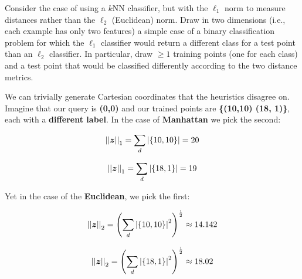 \documentclass[fleqn]{article}
\begin{document}
Consider the case of using a $k$NN classifier, but with the $\ell_1$
norm to measure distances rather than the $\ell_2$ (Euclidean) norm.
Draw in two dimensions (i.e., each example has only two features) 
a simple case of a binary classification problem for which the 
$\ell_1$ classifier would return a different class for a test point 
than an $\ell_2$ classifier.  In particular, draw $\geq 1$ training 
points (one for each class) and a test point that would be classified 
differently according to the two distance metrics.

\begin{solution}
We can trivially generate Cartesian coordinates that the heuristics disagree on. Imagine that our query is \textbf{(0,0)} and our trained points are \textbf{\{(10,10) (18, 1)\}}, each with a \textbf{different label}. In the case of \textbf{Manhattan} we pick the second:

\begin{equation}
\left\vert\left\vert \boldsymbol{z} \right\vert\right\vert_1 = \sum_d \left\vert \{10, 10\} \right\vert = 20
\end{equation}

\begin{equation}
\left\vert\left\vert \boldsymbol{z} \right\vert\right\vert_1 = \sum_d \left\vert \{18, 1\} \right\vert = 19
\end{equation}

Yet in the case of the \textbf{Euclidean}, we pick the first:

\begin{equation}
\left\vert\left\vert \boldsymbol{z} \right\vert\right\vert_2 = \left(\sum_d \left\vert \{10, 10\} \right\vert^2\right)^{\frac 1 2} \approx 14.142
\end{equation}

\begin{equation}
\left\vert\left\vert \boldsymbol{z} \right\vert\right\vert_2 = \left(\sum_d \left\vert \{18, 1\} \right\vert^2\right)^{\frac 1 2} \approx 18.02
\end{equation}

\end{solution}
\end{document}
